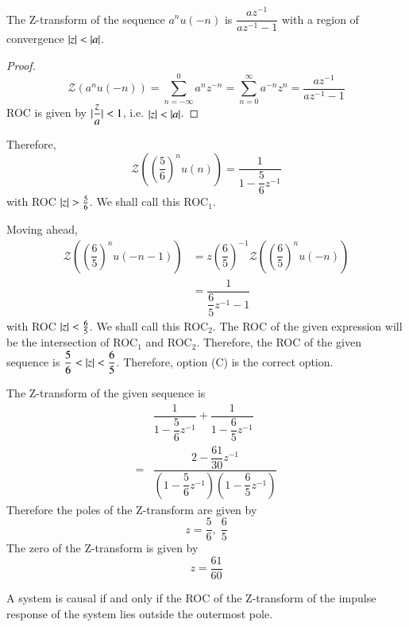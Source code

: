 \documentclass[journal,12pt,twocolumn]{IEEEtran}
\begin{document}
\begin{lemma}
The Z-transform of the sequence $a^nu(-n)$ is $\dfrac{az^{-1}}{az^{-1}-1}$ with a region of convergence $\vert z\vert < \vert a\vert$.
\end{lemma}
\begin{proof}
\begin{equation}
    \mathcal{Z}(a^nu(-n)) = \sum_{n=-\infty}^{0}a^nz^{-n} = \sum_{n=0}^{\infty}a^{-n}z^{n} = \dfrac{az^{-1}}{az^{-1}-1}
\end{equation}
ROC is given by $\vert\dfrac{z}{a}\vert < 1$, i.e. $\vert z\vert < \vert a\vert$.
\end{proof}
Therefore,
\begin{equation}
    \mathcal{Z}\left(\left(\dfrac{5}{6}\right)^nu(n)\right) = \dfrac{1}{1-\dfrac{5}{6}z^{-1}}
\end{equation}
with ROC $\vert z\vert > \frac{5}{6}$. We shall call this ROC$_1$.

Moving ahead,
\begin{align}
    \mathcal{Z}\left(\left(\dfrac{6}{5}\right)^nu(-n-1)\right) &= z\left(\dfrac{6}{5}\right)^{-1}\mathcal{Z}\left(\left(\dfrac{6}{5}\right)^nu(-n)\right)\\
    &= \dfrac{1}{\dfrac{6}{5}z^{-1}-1}
\end{align}
with ROC $\vert z\vert < \frac{6}{5}$. We shall call this ROC$_2$. The ROC of the given expression will be the intersection of ROC$_1$ and ROC$_2$. Therefore, the ROC of the given sequence is $\dfrac{5}{6} < \vert z\vert < \dfrac{6}{5}$. Therefore, option (C) is the correct option.

The Z-transform of the given sequence is 
\begin{align}
&\dfrac{1}{1-\dfrac{5}{6}z^{-1}}+\dfrac{1}{1-\dfrac{6}{5}z^{-1}}\\ 
= &\dfrac{2-\dfrac{61}{30}z^{-1}}{\left(1-\dfrac{5}{6}z^{-1}\right)\left(1-\dfrac{6}{5}z^{-1}\right)}
\end{align}
Therefore the poles of the Z-transform are given by 
\begin{equation}
    z = \dfrac{5}{6},\; \dfrac{6}{5}
\end{equation}
The zero of the Z-transform is given by 
\begin{equation}
    z = \dfrac{61}{60}
\end{equation}

\begin{lemma}
A system is causal if and only if the ROC of the Z-transform of the impulse response of the system lies outside the outermost pole.
\label{causility}
\end{lemma}
\end{document}
